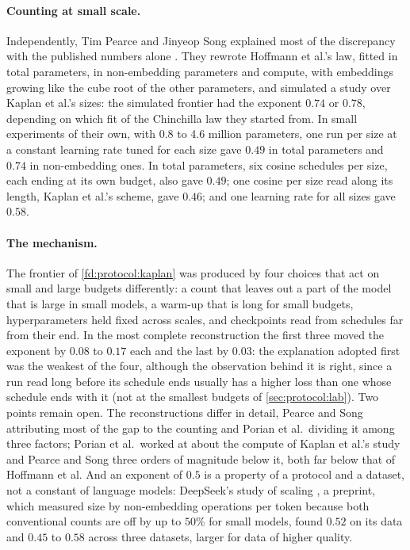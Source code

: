 \begin{refsection}
\paragraph{Counting at small scale.} Independently, Tim Pearce and Jinyeop Song explained most of the discrepancy with the published numbers alone \parencite{PearceSong2024}. They rewrote Hoffmann et al.'s law, fitted in total parameters, in non-embedding parameters and compute, with embeddings growing like the cube root of the other parameters, and simulated a study over Kaplan et al.'s sizes: the simulated frontier had the exponent $0.74$ or $0.78$, depending on which fit of the Chinchilla law they started from. In small experiments of their own, with 0.8 to 4.6 million parameters, one run per size at a constant learning rate tuned for each size gave $0.49$ in total parameters and $0.74$ in non-embedding ones. In total parameters, six cosine schedules per size, each ending at its own budget, also gave $0.49$; one cosine per size read along its length, Kaplan et al.'s scheme, gave $0.46$; and one learning rate for all sizes gave $0.58$.

\paragraph{The mechanism.} The frontier of \cref{fd:protocol:kaplan} was produced by four choices that act on small and large budgets differently: a count that leaves out a part of the model that is large in small models, a warm-up that is long for small budgets, hyperparameters held fixed across scales, and checkpoints read from schedules far from their end. In the most complete reconstruction the first three moved the exponent by $0.08$ to $0.17$ each and the last by $0.03$: the explanation adopted first was the weakest of the four, although the observation behind it is right, since a run read long before its schedule ends usually has a higher loss than one whose schedule ends with it (not at the smallest budgets of \cref{sec:protocol:lab}). Two points remain open. The reconstructions differ in detail, Pearce and Song attributing most of the gap to the counting and Porian et al.\ dividing it among three factors; Porian et al.\ worked at about the compute of Kaplan et al.'s study and Pearce and Song three orders of magnitude below it, both far below that of Hoffmann et al. And an exponent of $0.5$ is a property of a protocol and a dataset, not a constant of language models: DeepSeek's study of scaling \parencite{BiEtAl2024}, a preprint, which measured size by non-embedding operations per token because both conventional counts are off by up to $50\%$ for small models, found $0.52$ on its data and $0.45$ to $0.58$ across three datasets, larger for data of higher quality.


\end{refsection}
